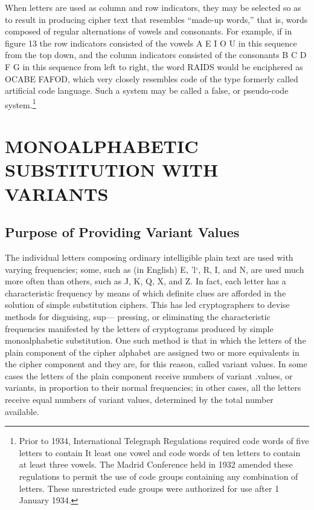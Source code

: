 \mypara When letters are used as column and row indicators, they may be
selected so as to result in producing cipher text that resembles “made-up
words,” that is, words composed of regular alternations of vowels and
consonants. For example, if in ﬁgure 13 the row indicators consisted of
the vowels A E I O U in this sequence from the top down, and the
column indicators consisted of the consonants B C D F G in this
sequence from left to right, the word RAIDS would be enciphered as
OCABE FAFOD, which very closely resembles code of the type formerly called artiﬁcial code language. Such a system may be called a
false, or pseudo-code system.\footnote{Prior to 1934, International Telegraph Regulations required code words of ﬁve letters to contain It least one vowel and code words of ten letters to contain at least three vowels. The Madrid Conference held in 1932 amended these regulations to permit the use of code groups containing any combination of letters. These unrestricted eude groups were authorized for use after 1 January 1934.}

\section{MONOALPHABETIC SUBSTITUTION WITH VARIANTS}

\subsection{Purpose of Providing Variant Values}

The individual letters composing ordinary intelligible plain text are
used with varying frequencies; some, such as (in English) E, 'l‘, R, I,
and N, are used much more often than others, such as J, K, Q, X, and Z.
In fact, each letter has a characteristic frequency by means of which
deﬁnite clues are afforded in the solution of simple substitution ciphers.
This has led cryptographers to devise methods for disguising, sup—
pressing, or eliminating the characteristic frequencies manifested by the
letters of cryptograms produced by simple monoalphabetic substitution.
One such method is that in which the letters of the plain component of
the cipher alphabet are assigned two or more equivalents in the cipher
component and they are, for this reason, called variant values. In some
cases the letters of the plain component receive numbers of variant
.values, or variants, in proportion to their normal frequencies; in other
cases, all the letters receive equal numbers of variant values, determined
by the total number available.

